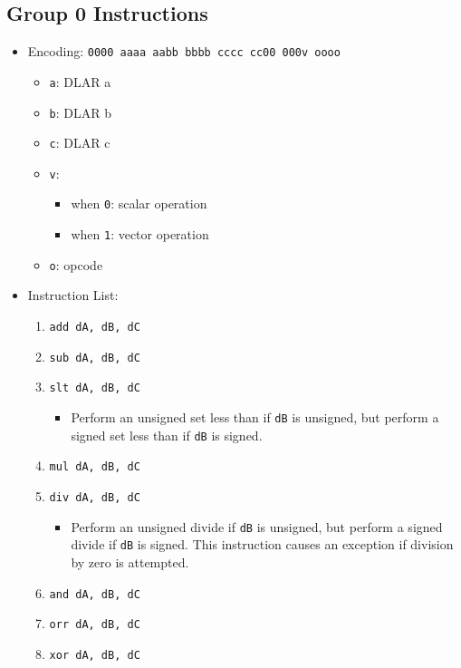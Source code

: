 \documentclass{article}
\begin{document}
	\subsection{Group 0 Instructions}
		\begin{itemize}
		\item Encoding:  \texttt{0000 aaaa aabb bbbb  cccc cc00 000v oooo}
			\begin{itemize}
			\item \texttt{a}:  DLAR a
			\item \texttt{b}:  DLAR b
			\item \texttt{c}:  DLAR c
			\item \texttt{v}:
				\begin{itemize}
				\item when \texttt{0}:  scalar operation
				\item when \texttt{1}:  vector operation
				\end{itemize}
			\item \texttt{o}:  opcode
			\end{itemize}
		\item Instruction List:
			\begin{enumerate}
			\item \texttt{add dA, dB, dC}
			\item \texttt{sub dA, dB, dC}
			\item \texttt{slt dA, dB, dC}
				\begin{itemize}
				\item Perform an unsigned set less than if \texttt{dB} is
					unsigned, but perform a signed set less than if
					\texttt{dB} is signed.
				\end{itemize}
			\item \texttt{mul dA, dB, dC}


			\item \texttt{div dA, dB, dC}
				\begin{itemize}
				\item Perform an unsigned divide if \texttt{dB} is
					unsigned, but perform a signed divide if \texttt{dB} is
					signed.  This instruction causes an exception if
					division by zero is attempted.
				\end{itemize}
			\item \texttt{and dA, dB, dC}
			\item \texttt{orr dA, dB, dC}
			\item \texttt{xor dA, dB, dC}



\end{enumerate}
\end{itemize}
\end{document}
